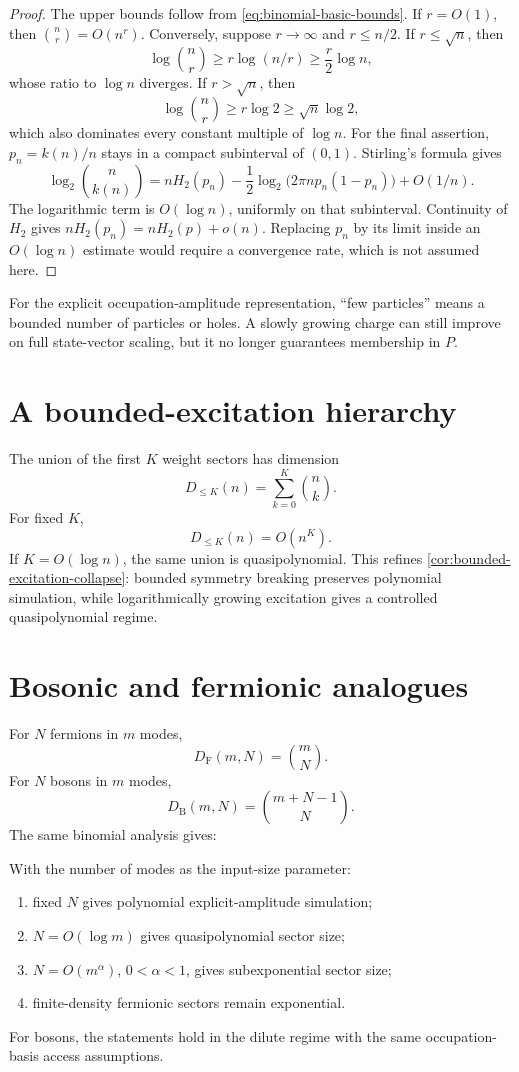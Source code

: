 \begin{proof}
The upper bounds follow from \cref{eq:binomial-basic-bounds}. If $r=O(1)$, then $\binom nr=O(n^r)$. Conversely, suppose $r\to\infty$ and $r\le n/2$. If $r\le\sqrt n$, then
\[
\log\binom nr
\ge
r\log(n/r)
\ge
\frac r2\log n,
\]
whose ratio to $\log n$ diverges. If $r>\sqrt n$, then
\[
\log\binom nr
\ge
r\log2
\ge
\sqrt n\log2,
\]
which also dominates every constant multiple of $\log n$. For the final assertion, $p_n=k(n)/n$ stays in a compact subinterval of $(0,1)$. Stirling's formula gives
\[
\log_2\binom n{k(n)}
=nH_2(p_n)-\frac12\log_2\!\bigl(2\pi n p_n(1-p_n)\bigr)+O(1/n).
\]
The logarithmic term is $O(\log n)$, uniformly on that subinterval. Continuity of $H_2$ gives $nH_2(p_n)=nH_2(p)+o(n)$. Replacing $p_n$ by its limit inside an $O(\log n)$ estimate would require a convergence rate, which is not assumed here.
\end{proof}

\begin{derivedbox}
For the explicit occupation-amplitude representation, ``few particles'' means a bounded number of particles or holes. A slowly growing charge can still improve on full state-vector scaling, but it no longer guarantees membership in $P$.
\end{derivedbox}

\section{A bounded-excitation hierarchy}
The union of the first $K$ weight sectors has dimension
\[
D_{\le K}(n)
=
\sum_{k=0}^{K}\binom nk.
\]
For fixed $K$,
\[
D_{\le K}(n)=O(n^K).
\]
If $K=O(\log n)$, the same union is quasipolynomial. This refines \cref{cor:bounded-excitation-collapse}: bounded symmetry breaking preserves polynomial simulation, while logarithmically growing excitation gives a controlled quasipolynomial regime.

\section{Bosonic and fermionic analogues}
For $N$ fermions in $m$ modes,
\[
D_{\mathrm F}(m,N)=\binom mN.
\]
For $N$ bosons in $m$ modes,
\[
D_{\mathrm B}(m,N)=\binom{m+N-1}{N}.
\]
The same binomial analysis gives:

\begin{corollary}
\label{cor:few-particle-scaling}
With the number of modes as the input-size parameter:
\begin{enumerate}
\item fixed $N$ gives polynomial explicit-amplitude simulation;
\item $N=O(\log m)$ gives quasipolynomial sector size;
\item $N=O(m^\alpha)$, $0<\alpha<1$, gives subexponential sector size;
\item finite-density fermionic sectors remain exponential.
\end{enumerate}
For bosons, the statements hold in the dilute regime with the same occupation-basis access assumptions.
\end{corollary}

